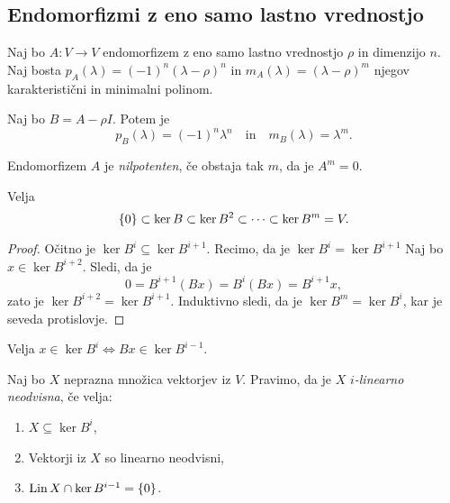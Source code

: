 \documentclass[12pt, a4paper]{article}
\begin{document}
\newpage

\subsection{Endomorfizmi z eno samo lastno vrednostjo}

Naj bo $A\colon V\to V$ endomorfizem z eno samo lastno vrednostjo $\rho$ in dimenzijo $n$. Naj bosta $p_A(\lambda)=(-1)^n(\lambda-\rho)^n$ in $m_A(\lambda)=(\lambda-\rho)^m$ njegov karakteristični in minimalni polinom.

\begin{trditev}
Naj bo $B=A-\rho I$. Potem je
\[
p_B(\lambda)=(-1)^n\lambda^n\quad\text{in}\quad m_B(\lambda)=\lambda^m.
\]
\end{trditev}

\obvs

\begin{definicija}
Endomorfizem $A$ je \emph{nilpotenten}, če obstaja tak $m$, da je $A^m=0$.
\end{definicija}

\begin{trditev}
Velja
\[
\left\{0\right\}\subset\ker B\subset\ker B^2\subset\dots\subset\ker B^m=V.
\]
\end{trditev}

\begin{proof}
Očitno je $\ker B^i\subseteq \ker B^{i+1}$. Recimo, da je $\ker B^i=\ker B^{i+1}$ Naj bo $x\in\ker B^{i+2}$. Sledi, da je
\[
0=B^{i+1}(Bx)=B^i(Bx)=B^{i+1}x,
\]
zato je $\ker B^{i+2}=\ker B^{i+1}$. Induktivno sledi, da je $\ker B^m=\ker B^i$, kar je seveda protislovje.
\end{proof}

\begin{trditev}
Velja $x\in\ker B^i\iff Bx\in\ker B^{i-1}$.
\end{trditev}

\obvs

\begin{definicija}
Naj bo $X$ neprazna množica vektorjev iz $V$. Pravimo, da je $X$ \emph{$i$-linearno neodvisna}, če velja:

\begin{enumerate}[label=\roman*)]
\item $X\subseteq \ker B^i$,
\item Vektorji iz $X$ so linearno neodvisni,
\item $\operatorname{Lin} X\cap\ker B^{i-1}=\left\{0\right\}$.
\end{enumerate}
\end{definicija}
\end{document}
